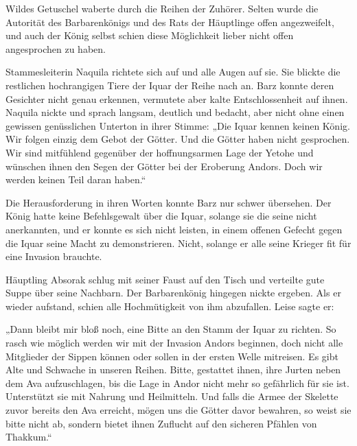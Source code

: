 Wildes Getuschel waberte durch die Reihen der Zuhörer. Selten wurde die Autorität des Barbarenkönigs und des Rats der Häuptlinge offen angezweifelt, und auch der König selbst schien diese Möglichkeit lieber nicht offen angesprochen zu haben.


Stammesleiterin Naquila richtete sich auf und alle Augen auf sie. Sie blickte die restlichen hochrangigen Tiere der Iquar der Reihe nach an. Barz konnte deren Gesichter nicht genau erkennen, vermutete aber kalte Entschlossenheit auf ihnen. Naquila nickte und sprach langsam, deutlich und bedacht, aber nicht ohne einen gewissen genüsslichen Unterton in ihrer Stimme: „Die Iquar kennen keinen König. Wir folgen einzig dem Gebot der Götter. Und die Götter haben nicht gesprochen. Wir sind mitfühlend gegenüber der hoffnungsarmen Lage der Yetohe und wünschen ihnen den Segen der Götter bei der Eroberung Andors. Doch wir werden keinen Teil daran haben.“

Die Herausforderung in ihren Worten konnte Barz nur schwer übersehen. Der König hatte keine Befehlsgewalt über die Iquar, solange sie die seine nicht anerkannten, und er konnte es sich nicht leisten, in einem offenen Gefecht gegen die Iquar seine Macht zu demonstrieren. Nicht, solange er alle seine Krieger fit für eine Invasion brauchte.

Häuptling Absorak schlug mit seiner Faust auf den Tisch und verteilte gute Suppe über seine Nachbarn. Der Barbarenkönig hingegen nickte ergeben. Als er wieder aufstand, schien alle Hochmütigkeit von ihm abzufallen. Leise sagte er:

„Dann bleibt mir bloß noch, eine Bitte an den Stamm der Iquar zu richten. So rasch wie möglich werden wir mit der Invasion Andors beginnen, doch nicht alle Mitglieder der Sippen können oder sollen in der ersten Welle mitreisen. Es gibt Alte und Schwache in unseren Reihen. Bitte, gestattet ihnen, ihre Jurten neben dem Ava aufzuschlagen, bis die Lage in Andor nicht mehr so gefährlich für sie ist. Unterstützt sie mit Nahrung und Heilmitteln. Und falls die Armee der Skelette zuvor bereits den Ava erreicht, mögen uns die Götter davor bewahren, so weist sie bitte nicht ab, sondern bietet ihnen Zuflucht auf den sicheren Pfählen von Thakkum.“

